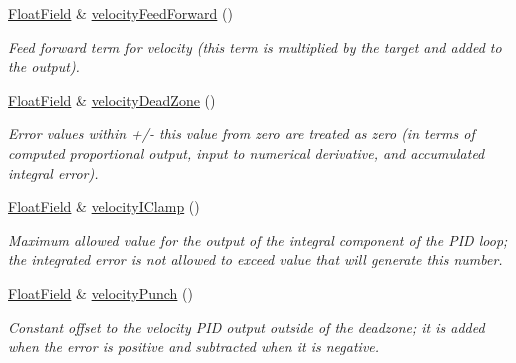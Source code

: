 \begin{DoxyCompactItemize}
\hyperlink{classhebi_1_1Command_1_1FloatField}{Float\+Field} \& \hyperlink{classhebi_1_1Command_1_1Settings_1_1Actuator_1_1VelocityGains_a4de848b17ddf892b1d474bac487dee3a}{velocity\+Feed\+Forward} ()
\begin{DoxyCompactList}\small\item\em Feed forward term for velocity (this term is multiplied by the target and added to the output). \end{DoxyCompactList}\item 
\mbox{\label{classhebi_1_1Command_1_1Settings_1_1Actuator_1_1VelocityGains_a2ea73387738ea5cbb084d8e50f077a7b}} 
\hyperlink{classhebi_1_1Command_1_1FloatField}{Float\+Field} \& \hyperlink{classhebi_1_1Command_1_1Settings_1_1Actuator_1_1VelocityGains_a2ea73387738ea5cbb084d8e50f077a7b}{velocity\+Dead\+Zone} ()
\begin{DoxyCompactList}\small\item\em Error values within +/-\/ this value from zero are treated as zero (in terms of computed proportional output, input to numerical derivative, and accumulated integral error). \end{DoxyCompactList}\item 
\mbox{\label{classhebi_1_1Command_1_1Settings_1_1Actuator_1_1VelocityGains_a2a5006c5ea06bfb46696c5afe1ebea03}} 
\hyperlink{classhebi_1_1Command_1_1FloatField}{Float\+Field} \& \hyperlink{classhebi_1_1Command_1_1Settings_1_1Actuator_1_1VelocityGains_a2a5006c5ea06bfb46696c5afe1ebea03}{velocity\+I\+Clamp} ()
\begin{DoxyCompactList}\small\item\em Maximum allowed value for the output of the integral component of the P\+ID loop; the integrated error is not allowed to exceed value that will generate this number. \end{DoxyCompactList}\item 
\mbox{\label{classhebi_1_1Command_1_1Settings_1_1Actuator_1_1VelocityGains_a60aac6765a0d1679a57fd4c14ae96ed9}} 
\hyperlink{classhebi_1_1Command_1_1FloatField}{Float\+Field} \& \hyperlink{classhebi_1_1Command_1_1Settings_1_1Actuator_1_1VelocityGains_a60aac6765a0d1679a57fd4c14ae96ed9}{velocity\+Punch} ()
\begin{DoxyCompactList}\small\item\em Constant offset to the velocity P\+ID output outside of the deadzone; it is added when the error is positive and subtracted when it is negative. \end{DoxyCompactList}\item 

\end{DoxyCompactItemize}
